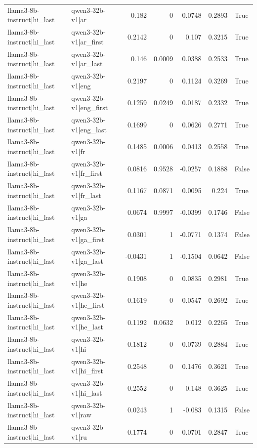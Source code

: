 \begin{table}
\begin{tabular}{l l r r r r l}
llama3-8b-instruct|hi_last & qwen3-32b-v1|ar & 0.182 & 0 & 0.0748 & 0.2893 & True \\
llama3-8b-instruct|hi_last & qwen3-32b-v1|ar_first & 0.2142 & 0 & 0.107 & 0.3215 & True \\
llama3-8b-instruct|hi_last & qwen3-32b-v1|ar_last & 0.146 & 0.0009 & 0.0388 & 0.2533 & True \\
llama3-8b-instruct|hi_last & qwen3-32b-v1|eng & 0.2197 & 0 & 0.1124 & 0.3269 & True \\
llama3-8b-instruct|hi_last & qwen3-32b-v1|eng_first & 0.1259 & 0.0249 & 0.0187 & 0.2332 & True \\
llama3-8b-instruct|hi_last & qwen3-32b-v1|eng_last & 0.1699 & 0 & 0.0626 & 0.2771 & True \\
llama3-8b-instruct|hi_last & qwen3-32b-v1|fr & 0.1485 & 0.0006 & 0.0413 & 0.2558 & True \\
llama3-8b-instruct|hi_last & qwen3-32b-v1|fr_first & 0.0816 & 0.9528 & -0.0257 & 0.1888 & False \\
llama3-8b-instruct|hi_last & qwen3-32b-v1|fr_last & 0.1167 & 0.0871 & 0.0095 & 0.224 & True \\
llama3-8b-instruct|hi_last & qwen3-32b-v1|ga & 0.0674 & 0.9997 & -0.0399 & 0.1746 & False \\
llama3-8b-instruct|hi_last & qwen3-32b-v1|ga_first & 0.0301 & 1 & -0.0771 & 0.1374 & False \\
llama3-8b-instruct|hi_last & qwen3-32b-v1|ga_last & -0.0431 & 1 & -0.1504 & 0.0642 & False \\
llama3-8b-instruct|hi_last & qwen3-32b-v1|he & 0.1908 & 0 & 0.0835 & 0.2981 & True \\
llama3-8b-instruct|hi_last & qwen3-32b-v1|he_first & 0.1619 & 0 & 0.0547 & 0.2692 & True \\
llama3-8b-instruct|hi_last & qwen3-32b-v1|he_last & 0.1192 & 0.0632 & 0.012 & 0.2265 & True \\
llama3-8b-instruct|hi_last & qwen3-32b-v1|hi & 0.1812 & 0 & 0.0739 & 0.2884 & True \\
llama3-8b-instruct|hi_last & qwen3-32b-v1|hi_first & 0.2548 & 0 & 0.1476 & 0.3621 & True \\
llama3-8b-instruct|hi_last & qwen3-32b-v1|hi_last & 0.2552 & 0 & 0.148 & 0.3625 & True \\
llama3-8b-instruct|hi_last & qwen3-32b-v1|raw & 0.0243 & 1 & -0.083 & 0.1315 & False \\
llama3-8b-instruct|hi_last & qwen3-32b-v1|ru & 0.1774 & 0 & 0.0701 & 0.2847 & True \\

\end{tabular}
\end{table}
